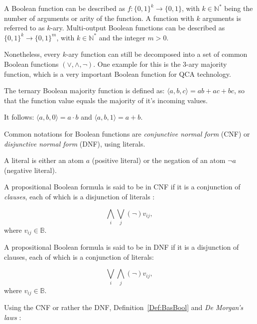 \begin{definition}
	A Boolean function can be described as $f: \{0, 1\}^k \to \{0, 1\}$, with $k \in \mathbb{N}^*$ being the number of arguments or arity of the function. A function with $k$ arguments is referred to as $k$-ary. Multi-output Boolean functions can be described as $\{0, 1\}^k \to \{0, 1\}^m$, with $k \in \mathbb{N}^*$ and the integer $m > 0$.
\end{definition}

Nonetheless, every $k$-ary function can still be decomposed into a set of common Boolean functions $(\vee, \wedge, \neg )$. One example for this is the 3-ary majority function, which is a very important Boolean function for QCA technology.

\begin{definition}\label{Def:majf}
	The ternary Boolean majority function is defined as: $\langle a, b, c \rangle = ab + ac + bc$, so that the function value equals the majority of it's incoming values.
	
	It follows: $\langle a, b, 0 \rangle = a \cdot b$ and $\langle a, b, 1 \rangle = a + b$.
\end{definition}

Common notations for Boolean functions are \textit{conjunctive normal form} (CNF) or \textit{disjunctive normal form} (DNF), using literals.

\begin{definition}[Literal]
	A literal is either an atom $a$ (positive literal) or the negation of an atom $\neg a$ (negative literal).
\end{definition}

\begin{definition}
	A propositional Boolean formula is said to be in CNF if it is a conjunction of \textit{clauses}, each of which is a disjunction of literals \cite{CNF}:
	
	\[\displaystyle\bigwedge_{i} \displaystyle\bigvee_{j} (\neg) v_{ij}, \]
	where $v_{ij} \in \mathbb{B}$.
	
	A propositional Boolean formula is said to be in DNF if it is a disjunction of clauses, each of which is a conjunction of literals:
	
	\[ \displaystyle\bigvee_{i} \displaystyle\bigwedge_{j} (\neg) v_{ij}, \]
	where $v_{ij} \in \mathbb{B}$.
	
\end{definition}

Using the CNF or rather the DNF, Definition~\ref{Def:BasBool} and \textit{De Morgan's laws} \cite{DeMorgans_laws}:

